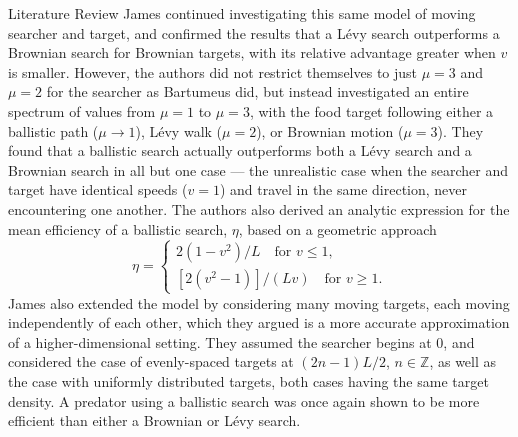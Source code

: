 \begin{section}{Literature Review \label{sec:litreview}}
James \etal \cite{James_2008} continued investigating this same model of moving searcher and target, and confirmed the results that a L\'{e}vy search outperforms a Brownian search for Brownian targets, with its relative advantage greater when $v$ is smaller.
However, the authors did not restrict themselves to just $\mu=3$ and $\mu=2$ for the searcher as Bartumeus \etal \cite{Bartumeus_2002} did, but instead investigated an entire spectrum of values from $\mu=1$ to $\mu=3$, with the food target following either a ballistic path ($\mu\to 1$), L\'{e}vy walk ($\mu=2$), or Brownian motion ($\mu=3$).
They found that a ballistic search actually outperforms both a L\'{e}vy search and a Brownian search in all but one case --- the unrealistic case when the searcher and target have identical speeds ($v=1$) and travel in the same direction, never encountering one another.
The authors also derived an analytic expression for the mean efficiency of a ballistic search, $\eta$, based on a geometric approach
\begin{equation*}
\eta = \begin{cases}
2(1-v^2)/L \quad \text{for } v \leq 1,\\
[2(v^2 - 1)]/(Lv) \quad \text{for }v \geq 1.
\end{cases}
\end{equation*}
James \etal \cite{James_2008} also extended the model by considering many moving targets, each moving independently of each other, which they argued is a more accurate approximation of a higher-dimensional setting.
They assumed the searcher begins at $0$, and considered the case of evenly-spaced targets at $(2n-1)L/2$, $n\in \mathbb{Z}$, as well as the case with uniformly distributed targets, both cases having the same target density.
A predator using a ballistic search was once again shown to be more efficient than either a Brownian or L\'{e}vy search.


\end{section}
